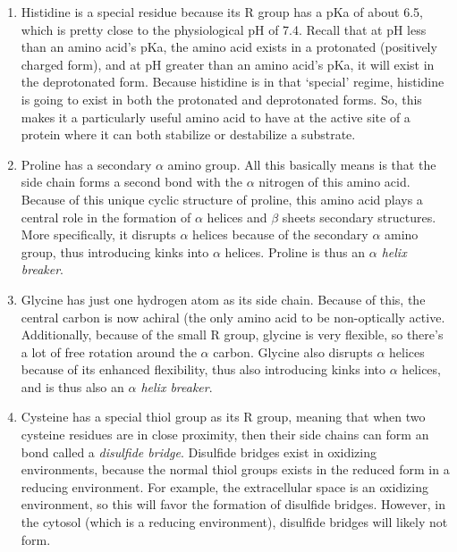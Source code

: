 \documentclass{article}
\theoremstyle{plain}%
\theoremstyle{definition}
\theoremstyle{remark}
\begin{document}
\begin{enumerate}
	\item Histidine is a special residue because its R group has a pKa of about 6.5, which is pretty close to the physiological pH of 7.4. Recall that at pH less than an amino acid's pKa, the amino acid exists in a protonated (positively charged form), and at pH greater than an amino acid's pKa, it will exist in the deprotonated form. Because histidine is in that `special' regime, histidine is going to exist in both the protonated and deprotonated forms. So, this makes it a particularly useful amino acid to have at the active site of a protein where it can both stabilize or destabilize a substrate.
	\item Proline has a secondary $\alpha$ amino group. All this basically means is that the side chain forms a second bond with the $\alpha$ nitrogen of this amino acid. Because of this unique cyclic structure of proline, this amino acid plays a central role in the formation of $\alpha$ helices and $\beta$ sheets secondary structures. More specifically, it disrupts $\alpha$ helices because of the secondary $\alpha$ amino group, thus introducing kinks into $\alpha$ helices. Proline is thus an \textit{$\alpha$ helix breaker}.
	\item Glycine has just one hydrogen atom as its side chain. Because of this, the central carbon is now achiral (the only amino acid to be non-optically active. Additionally, because of the small R group, glycine is very flexible, so there's a lot of free rotation around the $\alpha$ carbon. Glycine also disrupts $\alpha$ helices because of its enhanced flexibility, thus also introducing kinks into $\alpha$ helices, and is thus also an \textit{$\alpha$ helix breaker}. 
	\item Cysteine has a special thiol  group as its R group, meaning that when two cysteine residues are in close proximity, then their side chains can form an  bond called a \textit{disulfide bridge}. Disulfide bridges exist in oxidizing environments, because the normal thiol groups exists in the reduced form in a reducing environment. For example, the extracellular space is an oxidizing environment, so this will favor the formation of disulfide bridges. However, in the cytosol (which is a reducing environment), disulfide bridges will likely not form. 
\end{enumerate}
\end{document}

